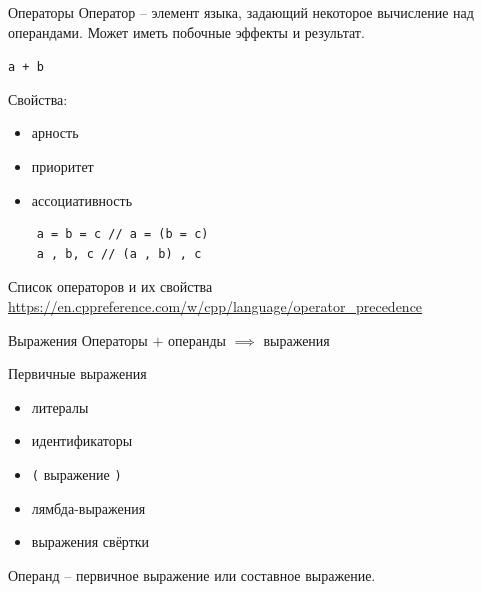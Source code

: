 \documentclass[unknownkeysallowed,xcolor=table]{beamer}
\begin{document}
\begin{frame}[fragile]{Операторы}
  Оператор -- элемент языка, задающий некоторое вычисление над операндами. Может иметь побочные эффекты и результат.
  
  \vspace{1em}

  \lstinline{a + b}
  
  \vspace{2em}

  Свойства:
  \begin{itemize}
    \item арность
    \item приоритет
    \item ассоциативность
  \end{itemize}
  \begin{lstlisting}
    a = b = c // a = (b = c)
    a , b, c // (a , b) , c
  \end{lstlisting}
\end{frame}

\begin{frame}{Список операторов и их свойства}
  \url{https://en.cppreference.com/w/cpp/language/operator_precedence}
\end{frame}

\begin{frame}[fragile]{Выражения}
  Операторы $+$ операнды $\implies$ выражения

  \vspace{2em}
  Первичные выражения
  \begin{itemize}
    \item литералы
    \item идентификаторы
    \item \lstinline{(} выражение \lstinline{)}
    \item лямбда-выражения
    \item выражения свёртки
  \end{itemize}

  \vspace{1.5em}
  Операнд -- первичное выражение или составное выражение.
\end{frame}
\end{document}
